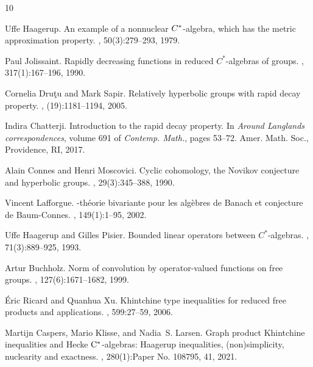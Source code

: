 \documentclass[12pt,reqno]{amsart}
\numberwithin{equation}{section}
\begin{document}
\begin{thebibliography}{10}

Uffe Haagerup.
\newblock An example of a nonnuclear {$C\sp{\ast} $}-algebra, which has the
  metric approximation property.
, 50(3):279--293, 1979.

Paul Jolissaint.
\newblock Rapidly decreasing functions in reduced {$C^*$}-algebras of groups.
, 317(1):167--196, 1990.

Cornelia Dru\c tu and Mark Sapir.
\newblock Relatively hyperbolic groups with rapid decay property.
, (19):1181--1194, 2005.

Indira Chatterji.
\newblock Introduction to the rapid decay property.
\newblock In {\em Around {L}anglands correspondences}, volume 691 of {\em
  Contemp. Math.}, pages 53--72. Amer. Math. Soc., Providence, RI, 2017.

Alain Connes and Henri Moscovici.
\newblock Cyclic cohomology, the {N}ovikov conjecture and hyperbolic groups.
, 29(3):345--388, 1990.

Vincent Lafforgue.
-th\'eorie bivariante pour les alg\`ebres de {B}anach et
  conjecture de {B}aum-{C}onnes.
, 149(1):1--95, 2002.

Uffe Haagerup and Gilles Pisier.
\newblock Bounded linear operators between {$C^*$}-algebras.
, 71(3):889--925, 1993.

Artur Buchholz.
\newblock Norm of convolution by operator-valued functions on free groups.
, 127(6):1671--1682, 1999.

\'Eric Ricard and Quanhua Xu.
\newblock Khintchine type inequalities for reduced free products and
  applications.
, 599:27--59, 2006.

Martijn Caspers, Mario Klisse, and Nadia~S. Larsen.
\newblock Graph product {K}hintchine inequalities and {H}ecke {$\rm
  C^\ast$}-algebras: {H}aagerup inequalities, (non)simplicity, nuclearity and
  exactness.
, 280(1):Paper No. 108795, 41, 2021.


\end{thebibliography}
\end{document}

